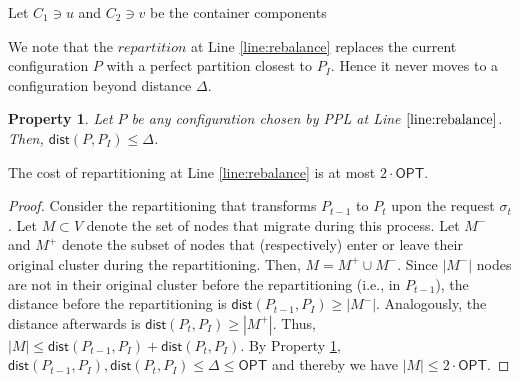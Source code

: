 \documentclass[manuscript,screen=true, review, anonymous]{acmart}
\newcommand{\OPT}{\textsf{OPT}\xspace}
\newcommand{\PPL}{\textsf{PPL}\xspace}
\newcommand{\dist}{\textsf{dist}}
\newtheorem{property}{Property}
\DeclarePairedDelimiter\set{\{}{\}}
\newcommand\maciek[1]{\color{brown}\textbf{\\ Maciek: #1}\color{black}}
\begin{document}
\begin{algorithm}
    \renewcommand{\algorithmicrequire}{\textbf{Input:}}
    \renewcommand{\algorithmicensure}{\textbf{Output:}}
    \begin{algorithmic}
         \label{line:initcomponents}
        \STATE Let $C_1 \ni u$ and $C_2 \ni v$ be the container components
         \label{line:mergecomponents}
        \label{line:rebalance} 
        \ENDIF
        \ENDIF
        \ENDFOR
    \end{algorithmic}
    \caption{Perfect Partition Learner (\PPL)}
    \label{alg:ppl}
      \end{algorithm}
  
      We note that the $\mathit{repartition}$ at Line \ref{line:rebalance} replaces the current configuration $P$ with a perfect partition closest to $P_I$.
Hence it never moves to a configuration beyond distance $\Delta$.      
\begin{property} \label{prop:dist<OPT}
    Let $P$ be any configuration chosen by \PPL at Line $\ref{line:rebalance}$.
    Then, $\dist(P,P_I) \leq \Delta$.
\end{property}

\begin{lemma}	\label{lemma:rebalancecost}
    The cost of repartitioning at Line \ref{line:rebalance} is at most $2\cdot\OPT$.
\end{lemma}
\begin{proof}
    Consider the repartitioning that transforms $P_{t-1}$ to $P_t$ upon the request $\sigma_t$.
    Let $M \subset V$ denote the set of nodes that migrate during this process.
	Let $M^-$ and $M^+$ denote the subset of nodes that (respectively)
    enter or leave their original cluster during the repartitioning.    
    Then,
    $M = M^+ \cup M^-$.
    Since $|M^-|$ nodes are not in their original cluster before the repartitioning (i.e., in $P_{t-1}$),
    the distance before the repartitioning is $\dist(P_{t-1},P_I) \geq | M^-|$.
    Analogously,
     the distance afterwards is $\dist(P_{t},P_I) \geq | M^+|$.
    Thus,
    $|M| \leq \dist(P_{t-1},P_I) + \dist(P_{t},P_I)$.
    By Property \ref{prop:dist<OPT},
    $\dist(P_{t-1},P_I) , \dist(P_{t},P_I) \leq \Delta \leq \OPT$
    and thereby we have	
    $|M| \leq 2\cdot\OPT$.
\end{proof}
\end{document}
